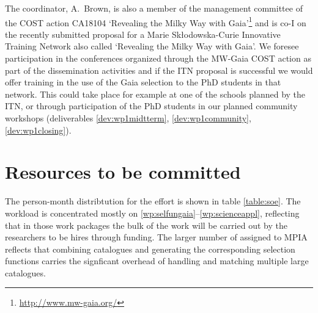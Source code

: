 The coordinator, A.~Brown, is also a member of the management committee of the COST action CA18104 `Revealing the Milky Way with Gaia'\footnote{\url{http://www.mw-gaia.org/}} and is co-I on the recently submitted proposal for a Marie Sk\l{}odowska-Curie Innovative Training Network also called `Revealing the Milky Way with Gaia'. We foresee participation in the conferences organized through the MW-Gaia COST action as part of the dissemination activities and if the ITN proposal is successful we would offer training in the use of the Gaia selection to the PhD students in that network. This could take place for example at one of the schools planned by the ITN, or through participation of the PhD students in our planned community workshops (deliverables \ref{dev:wp1midtterm}, \ref{dev:wp1community}, \ref{dev:wp1closing}).

\section{Resources to be committed}
\label{sec:resources}

\makesummaryofefforttable

The person-month distribtution for the {\acro} effort is shown in table \ref{table:soe}. The workload is concentrated mostly on \ref{wp:selfungaia}--\ref{wp:scienceappl}, reflecting that in those work packages the bulk of the work will be carried out by the researchers to be hires through {\acro} funding. The larger number of {\pems} assigned to MPIA reflects that combining catalogues and generating the corresponding selection functions carries the signficant overhead of handling and matching multiple large catalogues.


